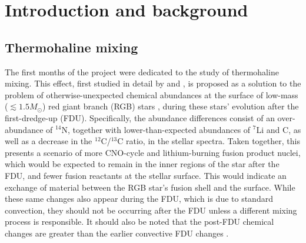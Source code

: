 \documentclass[12pt, a4paper]{report}
\begin{document}
\chapter{Introduction and background}

\section{Thermohaline mixing} \label{intro_thl}
The first months of the project were dedicated to the study of thermohaline mixing. This effect, first studied in detail by \cite{1972ApJ...172..165U} and \cite{1980A&A....91..175K}, is proposed as a solution to the problem of otherwise-unexpected chemical abundances at the surface of low-mass ($\lesssim 1.5M_{\odot}$) red giant branch (RGB) stars \cite{2010A&A...521A...9C}, during these stars' evolution after the first-dredge-up (FDU). Specifically, the abundance differences consist of an over-abundance of $^{14}$N, together with lower-than-expected abundances of $^{7}$Li and C, as well as a decrease in the $^{12}$C/$^{13}$C ratio, in the stellar spectra. Taken together, this presents a scenario of more CNO-cycle and lithium-burning fusion product nuclei, which would be expected to remain in the inner regions of the star after the FDU, and fewer fusion reactants at the stellar surface. This would indicate an exchange of material between the RGB star's fusion shell and the surface. While these same changes also appear during the FDU, which is due to standard convection, they should not be occurring after the FDU unless a different mixing process is responsible. It should  also be noted that the post-FDU chemical changes are greater than the earlier convective FDU changes \citep{2010ApJ...723..563D}.
\end{document}
